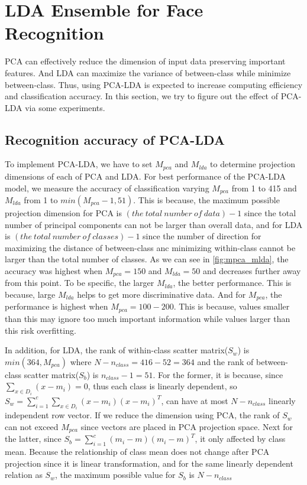 \section{LDA Ensemble for Face Recognition}
\label{sec:intro}

PCA can effectively reduce the dimension of input data preserving important features. And LDA can maximize the variance of between-class while minimize between-class. Thus, using PCA-LDA is expected to increase computing efficiency and classification accuracy. In this section, we try to figure out the effect of PCA-LDA via some experiments.

\subsection{Recognition accuracy of PCA-LDA}

To implement PCA-LDA, we have to set $M_{pca}$ and $M_{lda}$ to determine projection dimensions of each of PCA and LDA. For best performance of the PCA-LDA model, we measure the accuracy of classification varying $M_{pca}$ from 1 to 415 and $M_{lda}$ from 1 to $min(M_{pca}-1, 51)$. This is because, the maximum possible projection dimension for PCA is $(the\ total\ number\ of\ data)-1$ since the total number of principal components can not be larger than overall data, and for LDA is $(the\ total\ number\ of\ classes)-1$ since the number of direction for maximizing the distance of between-class anc minimizing within-class cannot be larger than the total number of classes. As we can see in \cref{fig:mpca_mlda}, the accuracy was highest when $M_{pca}=150$ and $M_{lda}=50$ and decreases further away from this point. To be specific, the larger $M_{lda}$, the better performance. This is because, large $M_{lda}$ helps to get more discriminative data. And for $M_{pca}$, the performance is highest when $M_{pca}=100-200$. This is because, values smaller than this may ignore too much important information while values larger than this risk overfitting.

In addition, for LDA, the rank of within-class scatter matrix($S_w$) is $min(364, M_{pca})$ where $N-n_{class}=416-52=364$ and the rank of between-class scatter matrix($S_b$) is $n_{class}-1=51$. For the former, it is because, since $\sum_{x\in D_i} (x-m_i) = 0$, thus each class is linearly dependent, so $S_w = \sum_{i=1}^c \sum_{x\in D_i} (x-m_i)(x-m_i)^T$, can have at most $N-n_{class}$ linearly independent row vector. If we reduce the dimension using PCA, the rank of $S_w$ can not exceed $M_{pca}$ since vectors are placed in PCA projection space. Next for the latter, since $S_b = \sum_{i=1}^c (m_i-m)(m_i-m)^T$, it only affected by class mean. Because the relationship of class mean does not change after PCA projection since it is linear transformation, and for the same linearly dependent relation as $S_w$, the maximum possible value for $S_b$ is $N-n_{class}$

